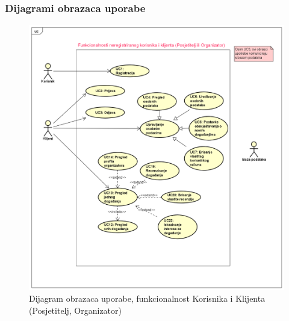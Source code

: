 					
					
				\newpage
					
					
				\subsubsection{Dijagrami obrazaca uporabe}
					
				\begin{figure}[H]
					\includegraphics[scale=0.5]{dijagrami/uc1.PNG} 
					\centering
					\caption{Dijagram obrazaca uporabe, funkcionalnost Korisnika i Klijenta (Posjetitelj, Organizator)}
					\label{fig:promjene}
				\end{figure}
				
				\newpage
				
